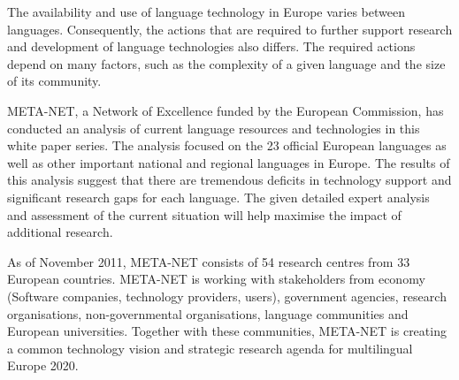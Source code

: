 \documentclass[]{../../metanetpaper}
\begin{document}
\begin{Parallel}[c]{79mm}{78mm}
{The availability and use of language technology in Europe varies between languages. Consequently, the actions that are required to further support research and development of language technologies also differs. The required actions depend on many factors, such as the complexity of a given language and the size of its community.

META-NET, a Network of Excellence funded by the European Commission, has conducted an analysis of current language resources and technologies in this white paper series. The analysis focused on the 23 official European languages as well as other important national and regional languages in Europe. The results of this analysis suggest that there are tremendous deficits in technology support and significant research gaps for each language. The given detailed expert analysis and assessment of the current situation will help maximise the impact of additional research.

As of November 2011, META-NET consists of 54 research centres from 33 European countries. META-NET is working with stakeholders from economy (Software companies, technology providers, users), government agencies, research organisations, non-governmental organisations, language communities and European universities. Together with these communities, META-NET is creating a common technology vision and strategic research agenda for multilingual Europe 2020.}
  
  \ParallelPar


  \clearpage

  \tableofcontents
  
  \clearpage

  \setcounter{page}{1}
  \pagestyle{scrheadings}

  
\end{Parallel}
\end{document}
